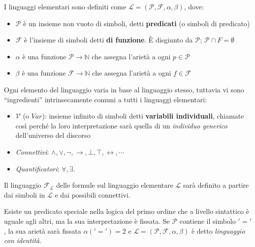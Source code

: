 \begin{defi}
I linguaggi elementari sono definiti come $\mathscr{L} = (\mathscr{P}, \mathscr{F}, \alpha, \beta)$,  dove:
\begin{itemize}
 \item $\mathscr{P}$ è un insieme non vuoto di simboli, detti \textbf{predicati} (o simboli di predicato)
 \item $\mathscr{F}$ è l'insieme di simboli detti \textbf{di funzione}. È disgiunto da $\mathscr{P}$; $\mathscr{P} \cap F = \emptyset$
 \item $\alpha$ è una funzione $\mathscr{P} \rightarrow \mathbb{N}$ che assegna l'arietà a ogni $p \in \mathscr{P}$
 \item $\beta$ è una funzione $\mathscr{F} \rightarrow \mathbb{N}$ che assegna l'arietà a ogni $f \in \mathscr{F}$
\end{itemize}
\end{defi}

Ogni elemento del linguaggio varia in base al linguaggio stesso, tuttavia vi sono ``ingredienti'' intrinsecamente comuni a tutti i linguaggi elementari:
\begin{itemize}
  \item $\mathscr{V}$ (o $Var$): insieme infinito di simboli detti \textbf{variabili individuali}, chiamate così perché la loro interpretazione sarà quella di un \textit{individuo generico} dell'universo del discorso
  \item \textit{Connettivi}: $\land, \lor, \neg, \rightarrow, \bot, \top, \leftrightarrow, \cdots$
  \item \textit{Quantificatori}: $\forall, \exists$.
\end{itemize} 

Il linguaggio $\mathscr{F}_\mathscr{L}$ delle formule sul linguaggio elementare $\mathscr{L}$ sarà definito 
a partire dai simboli in $\mathscr{L}$ e dai possibili connettivi. 

\begin{oss}
        Esiste un predicato speciale nella logica del primo ordine che a livello sintattico è uguale agli altri, ma la sua interpretazione è fissata. Se $\mathscr{P}$ contiene il simbolo $'='$, la sua arietà sarà fissata $\alpha('=') = 2$ e $\mathscr{L} = (\mathscr{P}, \mathscr{F}, \alpha, \beta)$ è detto \textit{linguaggio con identità}.
\end{oss}

